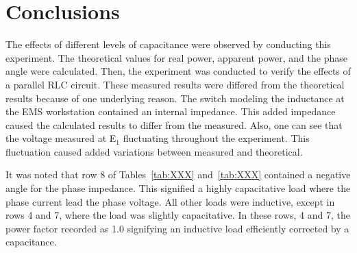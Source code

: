 \documentclass{article}
\begin{document}
\section{Conclusions}
The effects of different levels of capacitance were observed by conducting this
experiment. The theoretical values for real power, apparent power, and the
phase angle were calculated. Then, the experiment was conducted to verify the
effects of a parallel RLC circuit. These measured results were differed from
the theoretical results because of one underlying reason. The switch modeling
the inductance at the EMS workstation contained an internal impedance.  This
added impedance caused the calculated results to differ from the measured.
Also, one can see that the voltage measured at E$_1$ fluctuating throughout the
experiment. This fluctuation caused added variations between measured and
theoretical.

It was noted that row 8 of Tables~\ref{tab:XXX} and~\ref{tab:XXX} contained
a negative angle for the phase impedance. This signified a highly capacitative
load where the phase current lead the phase voltage. All other loads were
inductive, except in rows 4 and 7, where the load was slightly capacitative. In
these rows, 4 and 7, the power factor recorded as 1.0 signifying an inductive
load efficiently corrected by a capacitance.
\end{document}

